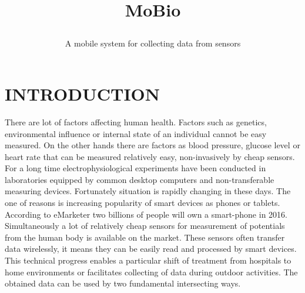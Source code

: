 \documentclass[a4paper,twoside]{article}
\begin{document}
\title{MoBio\subtitle{A mobile system for collecting data from sensors} }

\author{
}   



\onecolumn \maketitle \normalsize \vfill

\section{\uppercase{Introduction}}
\label{sec:introduction}

\noindent 
There are lot of factors affecting human health. Factors such as genetics, environmental influence or internal state of an individual cannot be easy measured. On the other hands there are factors as blood pressure, glucose level or heart rate that can be measured relatively easy, non-invasively by cheap sensors. For a long time electrophysiological experiments have been conducted in laboratories equipped by common desktop computers and non-transferable measuring devices. Fortunately situation is rapidly changing in these days. The one of reasons is increasing popularity of smart devices as phones or tablets. According to eMarketer \cite{emark} two billions of people will own a smart-phone in 2016. Simultaneously a lot of relatively cheap sensors for measurement of potentials from the human body is available on the market. These sensors often transfer data wirelessly, it means they can be easily read and processed by smart devices. This technical progress enables a particular shift of treatment from hospitals to home environments or facilitates collecting of data during outdoor activities. The obtained data can be used by two fundamental intersecting ways. 
\end{document}
